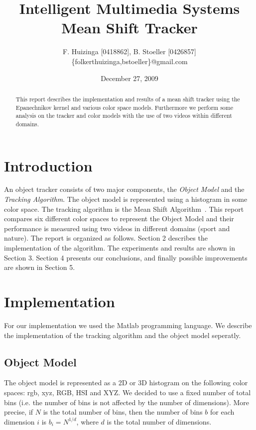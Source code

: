 \documentclass[11pt]{article}
\title{Intelligent Multimedia Systems \\ Mean Shift Tracker}
\author{F. Huizinga [0418862], B. Stoeller [0426857] \\
      \{folkerthuizinga,bstoeller\}@gmail.com}
\date{December 27, 2009}
\begin{document}
\maketitle

\begin{abstract}
This report describes the implementation and results of a mean shift tracker
using the Epanechnikov kernel and various color space models. Furthermore we
perform some analysis on the tracker and color models with the use of two
videos within different domains.
\end{abstract}


\section{Introduction}
An object tracker consists of two major components, the \emph{Object Model} and
the \emph{Tracking Algorithm}. The object model is represented using a
histogram in some color space. The tracking algorithm is the Mean Shift
Algorithm~\cite{kernel-basedobject, real-timetracking}. This report compares
six different color spaces to represent the Object Model and their performance
is measured using two videos in different domains (sport and nature). The
report is organized as follows.  Section 2 describes the implementation of the
algorithm. The experiments and results are shown in Section 3. Section 4
presents our conclusions, and finally possible improvements are shown in
Section 5.
\newpage


\section{Implementation}
For our implementation we used the Matlab programming language. We describe the
implementation of the tracking algorithm and the object model seperatly.

\subsection{Object Model}
The object model is represented as a 2D or 3D histogram on the following color
spaces: rgb, xyz, RGB, HSI and XYZ. We decided to use a fixed number of total
bins (i.e. the number of bins is not affected by the number of dimensions).
More precise, if $N$ is the total number of bins, then the number of bins $b$
for each dimension $i$ is $b_i = N^{1/d}$, where $d$ is the total number of
dimensions. 
\end{document}

